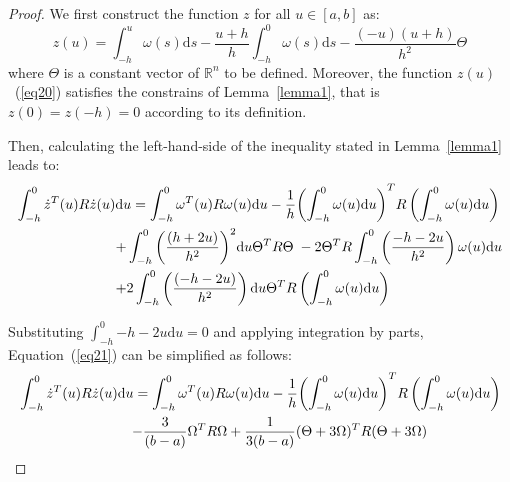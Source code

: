 \documentclass[a4paper]{cas-sc}
\newtheorem*{proof}{Proof}
\begin{document}
\begin{proof}
  We first construct the function $z$ for all $ u \in [a,b] $ as:
  \begin{equation}
    z(u) = \int_{ - h}^u {\omega (s){\text{d}}s}  - \frac{{u + h}}{h}\int_{ - h}^0 {\omega (s){\text{d}}s}  - \frac{{( - u)(u + h)}}{{{h^2}}}\Theta
    \label{eq20}
  \end{equation}
  where $ \Theta  $ is a constant vector of $ {\mathbb{R}^n} $ to be defined. Moreover, the function $z\left(u\right)$~(\ref{eq20}) satisfies the constrains of Lemma~\ref{lemma1}, that is $ z(0) = z( - h) = 0 $ according to its definition.

  Then, calculating the left-hand-side of the inequality stated in Lemma~\ref{lemma1} leads to:
  \begin{equation}
    \begin{gathered}
      \int_{ - h}^0 {{{\dot z}^T}(u)R\dot z(u){\text{d}}u}  = \int_{ - h}^0 {{\omega ^T}(u)R\omega (u){\text{d}}u}  - \frac{1}{h}{\left( {\int_{ - h}^0 {\omega (u){\text{d}}u} } \right)^T}R\left( {\int_{ - h}^0 {\omega (u){\text{d}}u} } \right) \hfill \\
      \quad \quad \quad \quad \quad \quad \quad  + \int_{ - h}^0 {{{\left( {\frac{{(h + 2u)}}{{{h^2}}}} \right)}^2}{\text{d}}u{\Theta ^T}R\Theta } \; - 2{\Theta ^T}R\int_{ - h}^0 {\left( {\frac{{ - h - 2u}}{{{h^2}}}} \right)\omega (u){\text{d}}u}  \hfill \\
      \quad \quad \quad \quad \quad \quad \quad  + 2\int_{ - h}^0 {\left( {\frac{{( - h - 2u)}}{{{h^2}}}} \right){\text{d}}u} {\Theta ^T}R\left( {\int_{ - h}^0 {\omega (u){\text{d}}u} } \right) \hfill \\
    \end{gathered}
    \label{eq21}
  \end{equation}

  Substituting $ \int_{ - h}^0 { - h - 2u{\text{d}}u}  = 0 $ and applying integration by parts, Equation~(\ref{eq21}) can be simplified as follows:
  \begin{equation}
    \begin{gathered}
      \int_{ - h}^0 {{{\dot z}^T}(u)R\dot z(u){\text{d}}u}  = \int_{ - h}^0 {{\omega ^T}(u)R\omega (u){\text{d}}u}  - \frac{1}{h}{\left( {\int_{ - h}^0 {\omega (u){\text{d}}u} } \right)^T}R\left( {\int_{ - h}^0 {\omega (u){\text{d}}u} } \right) \hfill \\
      \quad \quad \quad \quad \quad \quad \quad \quad  - \frac{3}{{(b - a)}}{\Omega ^T}R\Omega  + \frac{1}{{3(b - a)}}{(\Theta  + 3\Omega )^T}R(\Theta  + 3\Omega ) \hfill \\
    \end{gathered}
    \label{eq22}
  \end{equation}


\end{proof}
\end{document}
